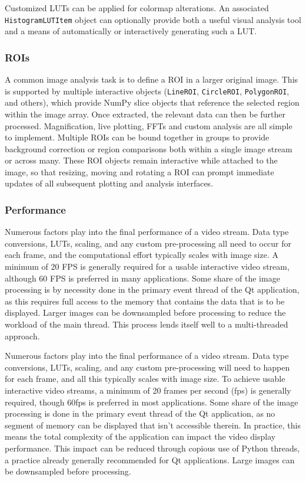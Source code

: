\documentclass[journal]{vgtc}                %
\begin{document}
\color{brown}
Customized LUTs can be applied for colormap alterations. An associated \texttt{HistogramLUTItem} object can optionally provide both a useful visual analysis tool and a means of automatically or interactively generating such a LUT.

\color{black}
\subsubsection{ROIs}

A common image analysis task is to define a ROI in a larger original image. This is supported by multiple interactive objects (\texttt{LineROI}, \texttt{CircleROI}, \texttt{PolygonROI}, and others), which provide NumPy slice objects that reference the selected region within the image array. Once extracted, the relevant data can then be further processed. Magnification, live plotting, FFTs and custom analysis are all simple to implement. Multiple ROIs can be bound together in groups to provide background correction or region comparisons both within a single image stream or across many. These ROI objects remain interactive while attached to the image, so that resizing, moving and rotating a ROI can prompt immediate updates of all subsequent plotting and analysis interfaces.

\subsubsection{Performance}

\makeMatplotlibComparison

\color{DarkOrchid}
Numerous factors play into the final performance of a video stream. Data type conversions, LUTs, scaling, and any custom pre-processing all need to occur for each frame, and the computational effort typically scales with image size. A minimum of 20 FPS is generally required for a usable interactive video stream, although 60 FPS is preferred in many applications. Some share of the image processing is by necessity done in the primary event thread of the Qt application, as this requires full access to the memory that contains the data that is to be displayed.  Larger images can be downsampled before processing to reduce the workload of the main thread. This process lends itself well to a multi-threaded approach.



\color{brown}
Numerous factors play into the final performance of a video stream. Data type conversions, LUTs, scaling, and any custom pre-processing will need to happen for each frame, and all this typically scales with image size. To achieve usable interactive video streams, a minimum of 20 frames per second (fps) is generally required, though 60fps is preferred in most applications. Some share of the image processing is done in the primary event thread of the Qt application, as no segment of memory can be displayed that isn't accessible therein. In practice, this means the total complexity of the application can impact the video display performance. This impact can be reduced through copious use of Python threads, a practice already generally recommended for Qt applications. Large images can be downsampled before processing.
\end{document}
